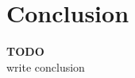 \documentclass[11pt]{article}
\newcommand\todo[1]{
\begin{center}
  \color{red}
  {\bf TODO}\\
  #1
\end{center}
}
\begin{document}
\section{Conclusion}
\label{sec:conclusion}


\todo{write conclusion}




\end{document}
